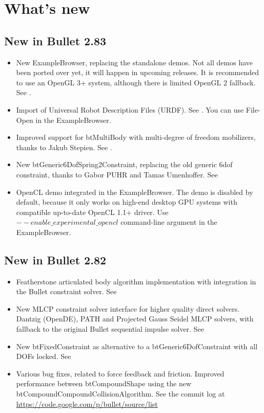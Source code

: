 \section{What's new}

\subsection{New in Bullet 2.83}
\begin{itemize}
	\item New ExampleBrowser, replacing the standalone demos. Not all demos have been ported over yet, it will happen in upcoming releases. It is recommended to use an OpenGL 3+ system, although there is limited OpenGL 2 fallback. See .
	\item Import of Universal Robot Description Files (URDF). See . You can use File-Open in the ExampleBrowser.
	\item Improved support for btMultiBody with multi-degree of freedom mobilizers, thanks to Jakub Stepien. See .
	\item New btGeneric6DofSpring2Constraint, replacing the old generic 6dof constraint, thanks to Gabor PUHR and Tamas Umenhoffer. See 	
	\item OpenCL demo integrated in the ExampleBrowser. The demo is disabled by default, because it only works on high-end desktop GPU systems with compatible up-to-date OpenCL 1.1+ driver. Use $--enable\_experimental\_opencl$ command-line argument in the ExampleBrowser.
	
	
\end{itemize}
\subsection{New in Bullet 2.82}
\begin{itemize}
	\item Featherstone articulated body algorithm implementation with integration in the Bullet constraint solver. See 
	\item New MLCP constraint solver interface for higher quality direct solvers. Dantzig (OpenDE), PATH and Projected Gauss Seidel MLCP solvers, with fallback to the original Bullet sequential impulse solver. See 
	\item New btFixedConstraint as alternative to a btGeneric6DofConstraint with all DOFs locked. See 
	\item Various bug fixes, related to force feedback and friction. Improved performance between btCompoundShape using the new btCompoundCompoundCollisionAlgorithm. See the commit log at \url{https://code.google.com/p/bullet/source/list}
\end{itemize}
